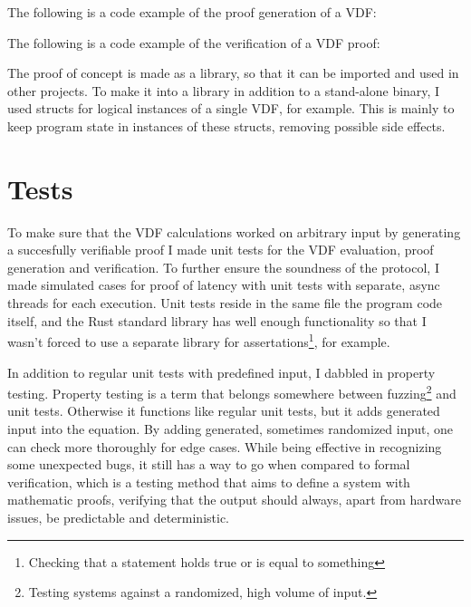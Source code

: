 The following is a code example of the proof generation of a VDF:

The following is a code example of the verification of a VDF proof:

The proof of concept is made as a library, so that it can be imported and used in other projects. To make it into a library in addition to a stand-alone binary, I used structs for logical instances of a single VDF, for example. This is mainly to keep program state in instances of these structs, removing possible side effects.


\section{Tests}
To make sure that the VDF calculations worked on arbitrary input by generating a succesfully verifiable proof I made unit tests for the VDF evaluation, proof generation and verification. To further ensure the soundness of the protocol, I made simulated cases for proof of latency with unit tests with separate, async threads for each execution. Unit tests reside in the same file the program code itself, and the Rust standard library has well enough functionality so that I wasn't forced to use a separate library for assertations\footnote{Checking that a statement holds true or is equal to something}, for example.

In addition to regular unit tests with predefined input, I dabbled in property testing. Property testing is a term that belongs somewhere between fuzzing\footnote{Testing systems against a randomized, high volume of input.} and unit tests. Otherwise it functions like regular unit tests, but it adds generated input into the equation. By adding generated, sometimes randomized input, one can check more thoroughly for edge cases. While being effective in recognizing some unexpected bugs, it still has a way to go when compared to formal verification, which is a testing method that aims to define a system with mathematic proofs, verifying that the output should always, apart from hardware issues, be predictable and deterministic.

